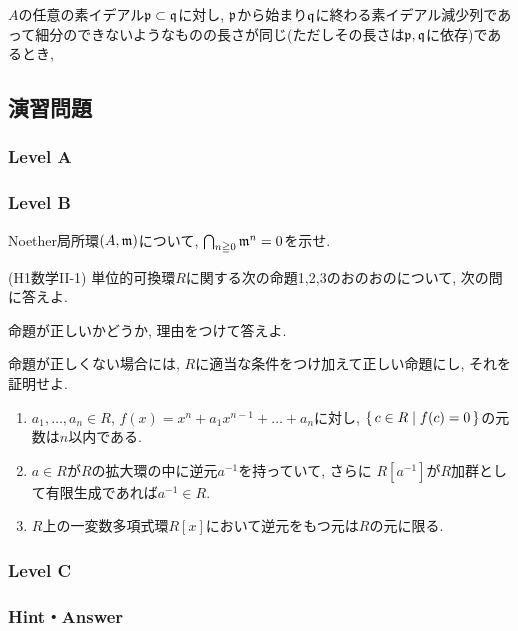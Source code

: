 \begin{prop} $A$の任意の素イデアル$\mathfrak{p}\subset \mathfrak{q}$に対し, $\mathfrak{p}$から始まり$\mathfrak{q}$に終わる素イデアル減少列であって細分のできないようなものの長さが同じ(ただしその長さは$\mathfrak{p},\mathfrak{q}$に依存)であるとき,
\end{prop}






\subsection{演習問題}

\subsubsection{Level A}

\subsubsection{Level B}
\begin{prob}
Noether局所環$(A,\mathfrak{m})$について, $\bigcap_{n\geqq 0} \mathfrak{m}^n = 0$を示せ.
\end{prob}


\begin{prob} (H1数学II-1)
単位的可換環$R$に関する次の命題1,2,3のおのおのについて, 次の問に答えよ.
\ben
\item 命題が正しいかどうか, 理由をつけて答えよ.
\item 命題が正しくない場合には, $R$に適当な条件をつけ加えて正しい命題にし, それを証明せよ.
\een
\begin{enumerate}[label=命題\arabic*]
\item $a_1,\dots, a_n\in R$, $f(x) = x^n + a_1x^{n-1} + \dots + a_n$に対し, $\set{c\in R\mid f(c) = 0}$の元数は$n$以内である.
\item $a\in R$が$R$の拡大環の中に逆元$a^{-1}$を持っていて, さらに
$R[a^{-1}]$が$R$加群として有限生成であれば$a^{-1}\in R$.
\item $R$上の一変数多項式環$R[x]$において逆元をもつ元は$R$の元に限る.
\end{enumerate}
\end{prob}



\subsubsection{Level C}


\subsubsection{Hint・Answer}


